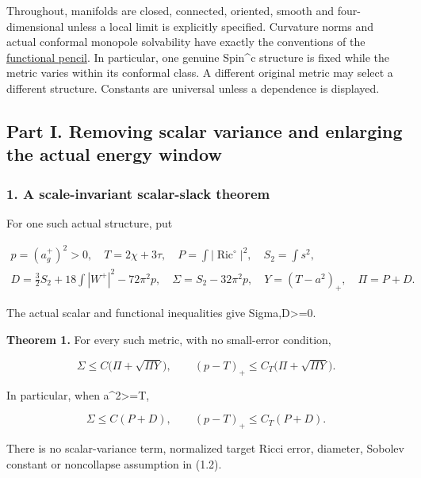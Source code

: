\documentclass[
  10pt,
]{article}
\begin{document}
Throughout, manifolds are closed, connected, oriented, smooth and
four-dimensional unless a local limit is explicitly specified. Curvature
norms and actual conformal monopole solvability have exactly the
conventions of the
\href{../mathematics/current/line1_functional_pencil.md}{functional
pencil}. In particular, one genuine Spin\^{}c structure is fixed while
the metric varies within its conformal class. A different original
metric may select a different structure. Constants are universal unless
a dependence is displayed.

\hypertarget{part-i.-removing-scalar-variance-and-enlarging-the-actual-energy-window}{%
\subsection{Part I. Removing scalar variance and enlarging the actual
energy
window}\label{part-i.-removing-scalar-variance-and-enlarging-the-actual-energy-window}}

\hypertarget{a-scale-invariant-scalar-slack-theorem}{%
\subsubsection{1. A scale-invariant scalar-slack
theorem}\label{a-scale-invariant-scalar-slack-theorem}}

For one such actual structure, put

\[
\begin{gathered}
 p=(a_g^+)^2>0,\quad T=2\chi+3\tau,\quad
 P=\int|\operatorname{Ric}^{\circ}|^2,\quad S_2=\int s^2,\\
 D=\frac32S_2+18\int|W^+|^2-72\pi^2p,\quad
 \Sigma=S_2-32\pi^2p,\quad Y=(T-a^2)_+,\quad \Pi=P+D.
\end{gathered}                                                     \tag{1.1}
\]

The actual scalar and functional inequalities give
Sigma,D\textgreater=0.

\textbf{Theorem 1.} For every such metric, with no small-error
condition,

\[
 \boxed{\Sigma\le C\bigl(\Pi+\sqrt{\Pi Y}\bigr),\qquad
 (p-T)_+\le C_T\bigl(\Pi+\sqrt{\Pi Y}\bigr).}             \tag{1.2}
\]

In particular, when a\^{}2\textgreater=T,

\[
 \boxed{\Sigma\le C(P+D),\qquad (p-T)_+\le C_T(P+D).}     \tag{1.3}
\]

There is no scalar-variance term, normalized target Ricci error,
diameter, Sobolev constant or noncollapse assumption in (1.2).
\end{document}
